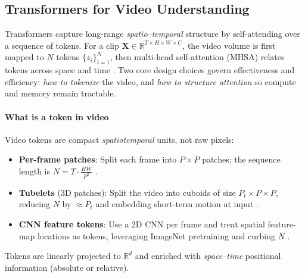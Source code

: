 \subsection{Transformers for Video Understanding}
\label{subsec:chapter24_video_transformers}

Transformers capture long-range \emph{spatio–temporal} structure by self-attending over a sequence of tokens. For a clip $\mathbf{X}\!\in\!\mathbb{R}^{T\times H\times W\times C}$, the video volume is first mapped to $N$ tokens $\{z_i\}_{i=1}^N$, then multi-head self-attention (MHSA) relates tokens across space and time \cite{bertasius2021_timesformer,arnab2021_vivit,neimark2021_vtn,fan2021_mvit,li2021_improved_mvit}. Two core design choices govern effectiveness and efficiency: \emph{how to tokenize} the video, and \emph{how to structure attention} so compute and memory remain tractable.

\paragraph{What is a token in video}
Video tokens are compact \emph{spatiotemporal} units, not raw pixels:
\begin{itemize}
    \item \textbf{Per-frame patches}: Split each frame into $P{\times}P$ patches; the sequence length is $N=T\cdot \frac{HW}{P^2}$ \cite{arnab2021_vivit}.
    \item \textbf{Tubelets} (3D patches): Split the video into cuboids of size $P_t{\times}P{\times}P$, reducing $N$ by $\approx P_t$ and embedding short-term motion at input \cite{arnab2021_vivit,bertasius2021_timesformer}.
    \item \textbf{CNN feature tokens}: Use a 2D CNN per frame and treat spatial feature-map locations as tokens, leveraging ImageNet pretraining and curbing $N$ \cite{neimark2021_vtn}.
\end{itemize}
Tokens are linearly projected to $\mathbb{R}^d$ and enriched with \emph{space–time} positional information (absolute or relative).

